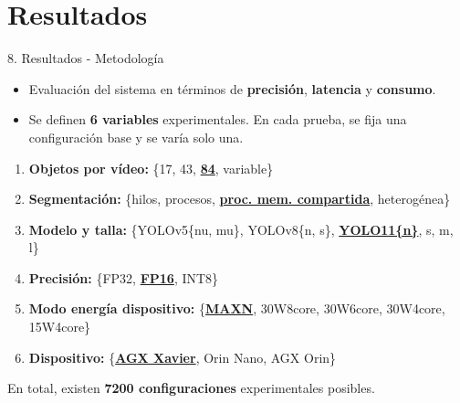 \documentclass[spanish]{beamer}
\begin{document}
\section{Resultados}
\begin{frame}{8. Resultados - Metodología}
    \begin{itemize}
        \item Evaluación del sistema en términos de \textbf{precisión}, \textbf{latencia} y \textbf{consumo}.
        \item Se definen \textbf{6 variables} experimentales. En cada prueba, se fija una configuración base y se varía solo una.
    \end{itemize}

    \begin{footnotesize}
    \begin{enumerate}
        \item \textbf{Objetos por vídeo:} \{17, 43, \underline{\textbf{84}}, variable\}
        \item \textbf{Segmentación:} \{hilos, procesos, \underline{\textbf{proc. mem. compartida}}, heterogénea\}
        \item \textbf{Modelo y talla:} \{YOLOv5\{nu, mu\}, YOLOv8\{n, s\}, \underline{\textbf{YOLO11\{n\}}}, s, m, l\}
        \item \textbf{Precisión:} \{FP32, \underline{\textbf{FP16}}, INT8\}
        \item \textbf{Modo energía dispositivo:} \{\underline{\textbf{MAXN}}, 30W8core, 30W6core, 30W4core, 15W4core\}
        \item \textbf{Dispositivo:} \{\underline{\textbf{AGX Xavier}}, Orin Nano, AGX Orin\}
    \end{enumerate}
    \end{footnotesize}
    En total, existen \textbf{7200 configuraciones} experimentales posibles.
\end{frame}
\end{document}
